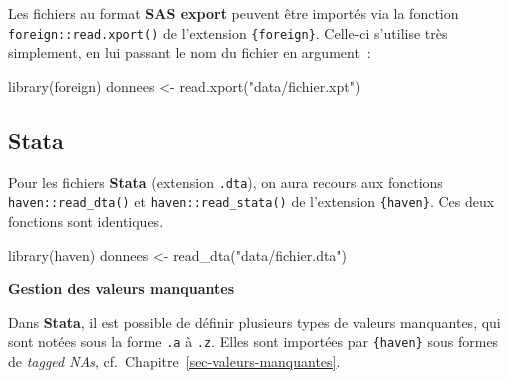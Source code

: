 \documentclass[
  letterpaper,
  DIV=11,
  numbers=noendperiod,
  oneside]{scrreprt}
\newenvironment{Shaded}{\begin{snugshade}}{\end{snugshade}}
\newcommand{\FunctionTok}[1]{\textcolor[rgb]{0.28,0.35,0.67}{#1}}
\newcommand{\NormalTok}[1]{\textcolor[rgb]{0.00,0.23,0.31}{#1}}
\newcommand{\OtherTok}[1]{\textcolor[rgb]{0.00,0.23,0.31}{#1}}
\newcommand{\StringTok}[1]{\textcolor[rgb]{0.13,0.47,0.30}{#1}}
\begin{document}
\begin{tcolorbox}[enhanced jigsaw, colbacktitle=quarto-callout-note-color!10!white, opacityback=0, toprule=.15mm, colback=white, coltitle=black, bottomtitle=1mm, toptitle=1mm, titlerule=0mm, rightrule=.15mm, title=\textcolor{quarto-callout-note-color}{\faInfo}\hspace{0.5em}{Note}, breakable, bottomrule=.15mm, opacitybacktitle=0.6, arc=.35mm, left=2mm, leftrule=.75mm, colframe=quarto-callout-note-color-frame]

Les fichiers au format \textbf{SAS export} peuvent être importés via la
fonction \texttt{foreign::read.xport()} de l'extension
\texttt{\{foreign\}}. Celle-ci s'utilise très simplement, en lui passant
le nom du fichier en argument~:

\begin{Shaded}
\begin{Highlighting}[]
\FunctionTok{library}\NormalTok{(foreign)}
\NormalTok{donnees }\OtherTok{\textless{}{-}} \FunctionTok{read.xport}\NormalTok{(}\StringTok{"data/fichier.xpt"}\NormalTok{)}
\end{Highlighting}
\end{Shaded}

\end{tcolorbox}

\hypertarget{stata}{%
\subsection{Stata}\label{stata}}

Pour les fichiers \textbf{Stata} (extension \texttt{.dta}), on aura
recours aux fonctions \texttt{haven::read\_dta()} et
\texttt{haven::read\_stata()} de l'extension \texttt{\{haven\}}. Ces
deux fonctions sont identiques.

\begin{Shaded}
\begin{Highlighting}[]
\FunctionTok{library}\NormalTok{(haven)}
\NormalTok{donnees }\OtherTok{\textless{}{-}} \FunctionTok{read\_dta}\NormalTok{(}\StringTok{"data/fichier.dta"}\NormalTok{)}
\end{Highlighting}
\end{Shaded}

\begin{tcolorbox}[enhanced jigsaw, colbacktitle=quarto-callout-important-color!10!white, opacityback=0, toprule=.15mm, colback=white, coltitle=black, bottomtitle=1mm, toptitle=1mm, titlerule=0mm, rightrule=.15mm, title=\textcolor{quarto-callout-important-color}{\faExclamation}\hspace{0.5em}{Important}, breakable, bottomrule=.15mm, opacitybacktitle=0.6, arc=.35mm, left=2mm, leftrule=.75mm, colframe=quarto-callout-important-color-frame]

\textbf{Gestion des valeurs manquantes}

Dans \textbf{Stata}, il est possible de définir plusieurs types de
valeurs manquantes, qui sont notées sous la forme \texttt{.a} à
\texttt{.z}. Elles sont importées par \texttt{\{haven\}} sous formes de
\emph{tagged NAs}, cf.~Chapitre~\ref{sec-valeurs-manquantes}.

\end{tcolorbox}
\end{document}
